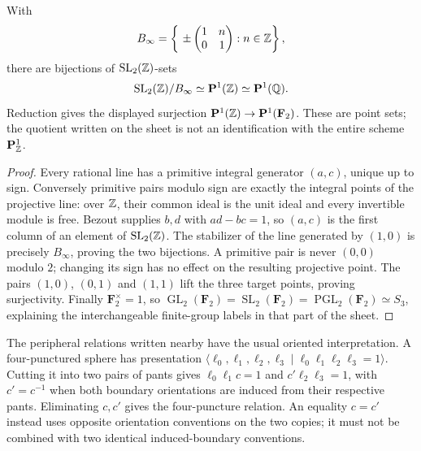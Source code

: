 \begin{proposition}\label{A6-projective-line}
With
\[
 B_\infty=\left\{\ \pm\begin{pmatrix}1&n\\0&1\end{pmatrix}
                    :n\in\Z\right\},
\]
there are bijections of $\operatorname{SL}_2({\mathbb{Z}})$-sets
\[
 \operatorname{SL}_2({\mathbb{Z}})/B_\infty
 \simeq\mathbf P^1({\mathbb{Z}})\simeq\mathbf P^1({\mathbb{Q}}).
\]
Reduction gives the displayed surjection
$\mathbf P^1({\mathbb{Z}})\to\mathbf P^1(\mathbf F_2)$.
These are point sets; the quotient written on the sheet is not an identification with the entire scheme $\mathbf P^1_{{\mathbb{Z}}}$.
\end{proposition}
\begin{proof}
Every rational line has a primitive integral generator $(a,c)$, unique up to sign. Conversely primitive pairs modulo sign are exactly the integral points of the projective line: over ${\mathbb{Z}}$, their common ideal is the unit ideal and every invertible module is free. Bezout supplies $b,d$ with $ad-bc=1$, so $(a,c)$ is the first column of an element of $\operatorname{SL}_2({\mathbb{Z}})$. The stabilizer of the line generated by $(1,0)$ is precisely $B_\infty$, proving the two bijections. A primitive pair is never $(0,0)$ modulo $2$; changing its sign has no effect on the resulting projective point. The pairs $(1,0)$, $(0,1)$ and $(1,1)$ lift the three target points, proving surjectivity. Finally $\mathbf F_2^\times=1$, so $\operatorname{GL}_2(\mathbf F_2)=\operatorname{SL}_2(\mathbf F_2)=\operatorname{PGL}_2(\mathbf F_2)\simeq S_3$, explaining the interchangeable finite-group labels in that part of the sheet.
\end{proof}

The peripheral relations written nearby have the usual oriented interpretation. A four-punctured sphere has presentation
$\langle\ell_0,\ell_1,\ell_2,\ell_3\mid
\ell_0\ell_1\ell_2\ell_3=1\rangle$.
Cutting it into two pairs of pants gives
$\ell_0\ell_1c=1$ and $c'\ell_2\ell_3=1$, with $c'=c^{-1}$ when both boundary orientations are induced from their respective pants. Eliminating $c,c'$ gives the four-puncture relation. An equality $c=c'$ instead uses opposite orientation conventions on the two copies; it must not be combined with two identical induced-boundary conventions.


